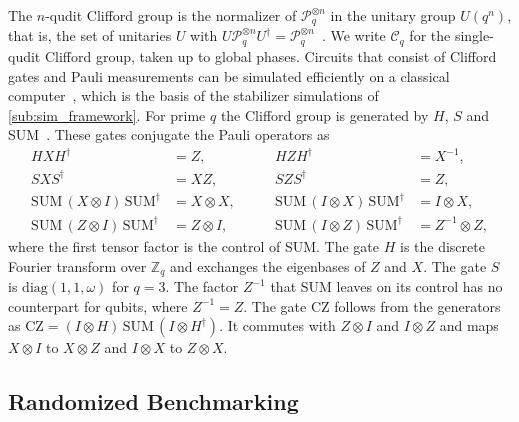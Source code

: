 The $n$-qudit Clifford group is the normalizer of $\mathcal{P}_q^{\otimes n}$ in the unitary group $U(q^n)$, that is, the set of unitaries $U$ with $U \mathcal{P}_q^{\otimes n} U^\dagger = \mathcal{P}_q^{\otimes n}$~\cite{Gottesman1999}. We write $\mathcal{C}_q$ for the single-qudit Clifford group, taken up to global phases. Circuits that consist of Clifford gates and Pauli measurements can be simulated efficiently on a classical computer~\cite{Gottesman1998}, which is the basis of the stabilizer simulations of \autoref{sub:sim_framework}. For prime $q$ the Clifford group is generated by $H$, $S$ and SUM~\cite{Hostens2005}. These gates conjugate the Pauli operators as
\begin{equation}
  \begin{aligned}
    H X H^\dagger &= Z, &\qquad H Z H^\dagger &= X^{-1}, \\
    S X S^\dagger &= X Z, &\qquad S Z S^\dagger &= Z, \\
    \mathrm{SUM}\,(X \otimes I)\,\mathrm{SUM}^\dagger &= X \otimes X, &\qquad \mathrm{SUM}\,(I \otimes X)\,\mathrm{SUM}^\dagger &= I \otimes X, \\
    \mathrm{SUM}\,(Z \otimes I)\,\mathrm{SUM}^\dagger &= Z \otimes I, &\qquad \mathrm{SUM}\,(I \otimes Z)\,\mathrm{SUM}^\dagger &= Z^{-1} \otimes Z,
  \end{aligned}
  \label{eq:bg-conjugation}
\end{equation}
where the first tensor factor is the control of SUM. The gate $H$ is the discrete Fourier transform over $\mathbb{Z}_q$ and exchanges the eigenbases of $Z$ and $X$. The gate $S$ is $\mathrm{diag}(1, 1, \omega)$ for $q = 3$. The factor $Z^{-1}$ that SUM leaves on its control has no counterpart for qubits, where $Z^{-1} = Z$. The gate CZ follows from the generators as $\mathrm{CZ} = (I \otimes H)\,\mathrm{SUM}\,(I \otimes H^\dagger)$. It commutes with $Z \otimes I$ and $I \otimes Z$ and maps $X \otimes I$ to $X \otimes Z$ and $I \otimes X$ to $Z \otimes X$.

\subsection{Randomized Benchmarking}
\label{app:background-rb}

